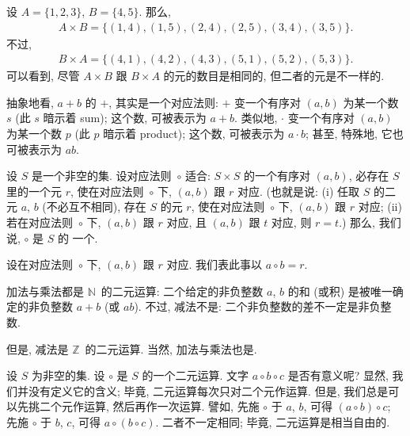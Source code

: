 \documentclass[%
    UTF8,%
    fontset=none,%
    punct=kaiming,%
    zihao=-4,%
    a4paper,%
    oneside,%
]{ctexbook}
\let\emph\relax
\begin{document}
\begin{example}
    设 \(A = \{ 1, 2, 3\}\),
    \(B = \{4, 5\}\).
    那么,
    \begin{align*}
        A \times B
        = \{ (1,4),(1,5),(2,4),(2,5),(3,4),(3,5) \}.
    \end{align*}
    不过,
    \begin{align*}
        B \times A
        = \{ (4,1),(4,2),(4,3),(5,1),(5,2),(5,3) \}.
    \end{align*}
    可以看到, 尽管 \(A \times B\) 跟 \(B \times A\)
    的元的数目是相同的,
    但二者的元是不一样的.
\end{example}

抽象地看, \(a + b\) 的 \(+\),
其实是一个对应法则:
\(+\) 变一个有序对 \((a, b)\)
为某一个\emph{唯一确定的}数 \(s\)
(此 \(s\) 暗示着 sum);
这个数, 可被表示为 \(a + b\).
类似地, \(\cdot\) 变一个有序对 \((a, b)\)
为某一个\emph{唯一确定的}数 \(p\)
(此 \(p\) 暗示着 product);
这个数, 可被表示为 \(a \cdot b\);
甚至, 特殊地, 它也可被表示为 \(ab\).

\begin{definition}
    设 \(S\) 是一个非空的集.
    设对应法则~\(\circ\) 适合:
    \emph{任取} \(S \times S\)
    的一个有序对 \((a, b)\),
    必存在 \(S\) 里的\emph{唯一的}一个元 \(r\),
    使在对应法则~\(\circ\) 下,
    \((a, b)\) 跟 \(r\) 对应.
    (也就是说:
    (i)
    任取 \(S\) 的二元 \(a\), \(b\)
    (不必互不相同),
    存在 \(S\) 的元 \(r\),
    使在对应法则~\(\circ\) 下,
    \((a, b)\) 跟 \(r\) 对应;
    (ii)
    若在对应法则~\(\circ\) 下,
    \((a, b)\) 跟 \(r\) 对应,
    且 \((a, b)\) 跟 \(t\) 对应,
    则 \(r = t\).)
    那么, 我们说, \(\circ\) 是 \(S\) 的%
    一个\emph{二元运算}.

    设在对应法则~\(\circ\) 下,
    \((a, b)\) 跟 \(r\) 对应.
    我们表此事以 \(a \circ b = r\).
\end{definition}

\begin{example}
    加法与乘法都是 \(\mathbb{N}\)~的二元运算:
    二个给定的非负整数 \(a\), \(b\)
    的和 (或积) 是被唯一确定的非负整数
    \(a + b\)
    (或 \(ab\)).
    不过, 减法不是:
    二个非负整数的差不一定是非负整数.

    但是, 减法是 \(\mathbb{Z}\)~的二元运算.
    当然, 加法与乘法也是.
\end{example}

设 \(S\) 为非空的集.
设 \(\circ\) 是 \(S\) 的一个二元运算.
文字 \(a \circ b \circ c\) 是否有意义呢?
显然, 我们并没有定义它的含义;
毕竟, 二元运算每次只对二个元作运算.
但是, 我们总是可以先挑二个元作运算,
然后再作一次运算.
譬如, 先施 \(\circ\) 于 \(a\), \(b\),
可得 \((a \circ b) \circ c\);
先施 \(\circ\) 于 \(b\), \(c\),
可得 \(a \circ (b \circ c)\).
二者不一定相同;
毕竟, 二元运算是相当自由的.
\end{document}
